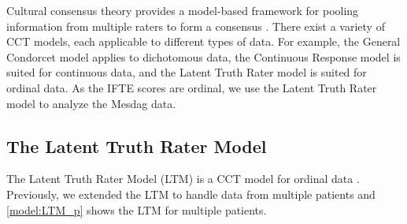 \documentclass[a4paper,11pt]{article}
\begin{document}
Cultural consensus theory provides a model-based framework for pooling information from multiple raters to form a consensus \parencite{anders2014cultural}.
There exist a variety of CCT models, each applicable to different types of data.
For example, the General Condorcet model \parencite{Batchelder1986statistical} applies to dichotomous data, the Continuous Response model \parencite{anders2014cultural} is suited for continuous data, and the Latent Truth Rater model \parencite{Anders2015cultural} is suited for ordinal data.
As the IFTE scores are ordinal, we use the Latent Truth Rater model to analyze the Mesdag data.

\subsection{The Latent Truth Rater Model}
The Latent Truth Rater Model (LTM) is a CCT model for ordinal data \parencite{Anders2015cultural}.
Previously, we extended the LTM to handle data from multiple patients \parencite{vandenBergh2020cultural} and \autoref{model:LTM_p} shows the LTM for multiple patients.
\end{document}
